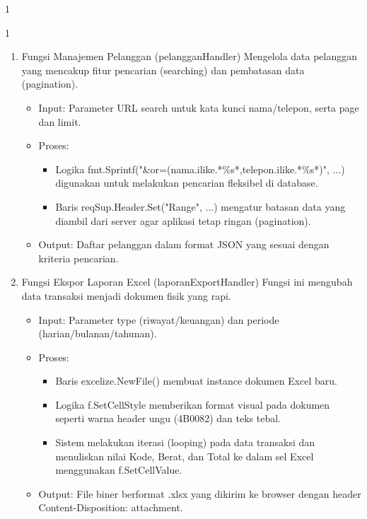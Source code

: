 \begin{enumerate}
\begin{spacing}{1}
\begin{spacing}{1}
\begin{enumerate}[label=\Alph*.]
    \item Fungsi Manajemen Pelanggan (pelangganHandler) Mengelola data pelanggan yang mencakup fitur pencarian (searching) dan pembatasan data (pagination).
    \begin{itemize}
        \item Input: Parameter URL search untuk kata kunci nama/telepon, serta page dan limit.
        \item Proses:
        \begin{itemize}
            \item Logika fmt.Sprintf("&or=(nama.ilike.*\%s*,telepon.ilike.*\%s*)", ...) digunakan untuk melakukan pencarian fleksibel di database.
            \item Baris reqSup.Header.Set("Range", ...) mengatur batasan data yang diambil dari server agar aplikasi tetap ringan (pagination).
        \end{itemize}
        \item Output: Daftar pelanggan dalam format JSON yang sesuai dengan kriteria pencarian.
    \end{itemize}


    \item Fungsi Ekspor Laporan Excel (laporanExportHandler) Fungsi ini mengubah data transaksi menjadi dokumen fisik yang rapi.
    \begin{itemize}
        \item Input: Parameter type (riwayat/keuangan) dan periode (harian/bulanan/tahunan).
        \item Proses:
        \begin{itemize}
            \item Baris excelize.NewFile() membuat instance dokumen Excel baru.
            \item Logika f.SetCellStyle memberikan format visual pada dokumen seperti warna header ungu (4B0082) dan teks tebal.
            \item Sistem melakukan iterasi (looping) pada data transaksi dan menuliskan nilai Kode, Berat, dan Total ke dalam sel Excel menggunakan f.SetCellValue.
        \end{itemize}
        \item Output: File biner berformat .xlsx yang dikirim ke browser dengan header Content-Disposition: attachment.
    \end{itemize}



\end{enumerate}
\end{spacing}
\end{spacing}
\end{enumerate}
